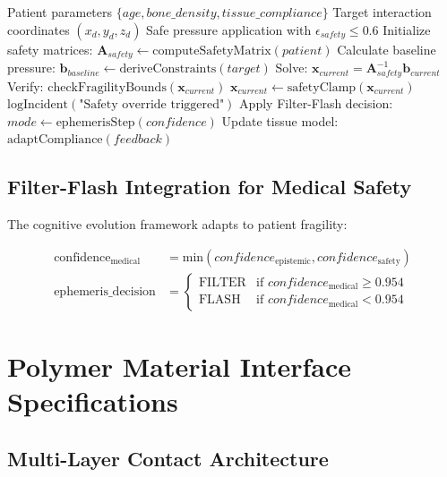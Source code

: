 \documentclass[11pt]{article}
\begin{document}
\begin{algorithm}
\caption{AEGIS Fragile Tissue Pressure Controller}
\begin{algorithmic}[1]
\REQUIRE Patient parameters $\{age, bone\_density, tissue\_compliance\}$
\REQUIRE Target interaction coordinates $(x_d, y_d, z_d)$
\ENSURE Safe pressure application with $\epsilon_{safety} \leq 0.6$
\STATE Initialize safety matrices: $\mathbf{A}_{safety} \leftarrow \text{computeSafetyMatrix}(patient)$
\STATE Calculate baseline pressure: $\mathbf{b}_{baseline} \leftarrow \text{deriveConstraints}(target)$
    \STATE Solve: $\mathbf{x}_{current} = \mathbf{A}_{safety}^{-1} \mathbf{b}_{current}$
    \STATE Verify: $\text{checkFragilityBounds}(\mathbf{x}_{current})$
        \STATE $\mathbf{x}_{current} \leftarrow \text{safetyClamp}(\mathbf{x}_{current})$
        \STATE $\text{logIncident}(\text{"Safety override triggered"})$
    \ENDIF
    \STATE Apply Filter-Flash decision: $mode \leftarrow \text{ephemerisStep}(confidence)$
    \STATE Update tissue model: $\text{adaptCompliance}(feedback)$
\ENDWHILE
\end{algorithmic}
\end{algorithm}

\subsection{Filter-Flash Integration for Medical Safety}

The cognitive evolution framework adapts to patient fragility:

\begin{align}
\text{confidence}_{\text{medical}} &= \text{min}(confidence_{\text{epistemic}}, confidence_{\text{safety}}) \\
\text{ephemeris\_decision} &= \begin{cases}
\text{FILTER} & \text{if } confidence_{\text{medical}} \geq 0.954 \\
\text{FLASH} & \text{if } confidence_{\text{medical}} < 0.954
\end{cases}
\end{align}

\section{Polymer Material Interface Specifications}

\subsection{Multi-Layer Contact Architecture}
\end{document}
